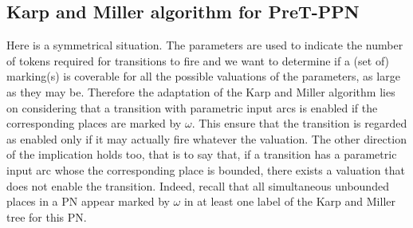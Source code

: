 \subsection{Karp and Miller algorithm for PreT-\ac{PPN}}

Here is a symmetrical situation.
The parameters are used to indicate the number of tokens required for transitions to fire and we want to determine if a (set of) marking(s) is coverable for all the possible valuations of the parameters, as large as they may be.
Therefore the adaptation of the Karp and Miller algorithm lies on considering that a transition with parametric input arcs is enabled if the corresponding places are marked by $\omega$.
This ensure that the transition is regarded as enabled only if it may actually fire whatever the valuation.
The other direction of the implication holds too, that is to say that, if a transition has a parametric input arc whose the corresponding place is bounded, there exists a valuation that does not enable the transition.
Indeed, recall that all simultaneous unbounded places in a \ac{PN} appear marked by $\omega$ in at least one label of the Karp and Miller tree for this \ac{PN}.

